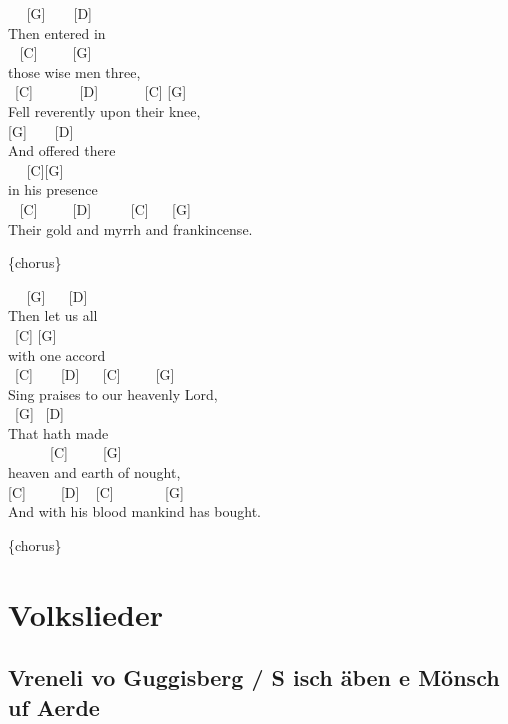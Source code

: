 \documentclass[
  letterpaper,
]{scrbook}
\begin{document}
~ ~{[}G{]} ~ ~ {[}D{]}\\
Then entered in\\
\hspace*{0.333em} ~ {[}C{]} ~ ~ ~{[}G{]}\\
those wise men three,\\
\hspace*{0.333em} ~{[}C{]} ~ ~ ~ ~{[}D{]} ~ ~ ~ ~{[}C{]} {[}G{]}\\
Fell reverently upon their knee,\\
\hspace*{0.333em} {[}G{]} ~ ~ {[}D{]}\\
And offered there\\
\hspace*{0.333em} ~ ~{[}C{]}{[}G{]}\\
in his presence\\
\hspace*{0.333em} ~ {[}C{]} ~ ~ ~{[}D{]} ~ ~ ~ {[}C{]} ~ ~{[}G{]}\\
Their gold and myrrh and frankincense.

\{chorus\}

~ ~{[}G{]} ~ ~{[}D{]}\\
Then let us all\\
\hspace*{0.333em} ~{[}C{]} {[}G{]}\\
with one accord ~\\
\hspace*{0.333em} ~{[}C{]} ~ ~ {[}D{]} ~ ~{[}C{]} ~ ~ ~{[}G{]}\\
Sing praises to our heavenly Lord,\\
\hspace*{0.333em} ~{[}G{]} ~{[}D{]}\\
That hath made\\
\hspace*{0.333em} ~ ~ ~ ~{[}C{]} ~ ~ ~{[}G{]}\\
heaven and earth of nought,\\
\hspace*{0.333em} {[}C{]} ~ ~ ~{[}D{]} ~ {[}C{]} ~ ~ ~ ~ {[}G{]}\\
And with his blood mankind has bought.

\{chorus\}

\part{Volkslieder}

\hypertarget{vreneli-vo-guggisberg-s-isch-uxe4ben-e-muxf6nsch-uf-aerde}{%
\chapter{Vreneli vo Guggisberg / S isch äben e Mönsch uf
Aerde}\label{vreneli-vo-guggisberg-s-isch-uxe4ben-e-muxf6nsch-uf-aerde}}
\end{document}
